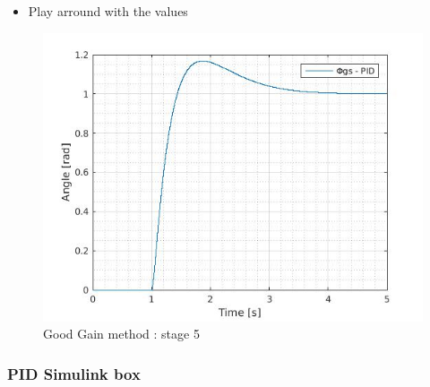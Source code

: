     
\begin{itemize}
  \item Play arround with the values
\end{itemize}
  
  \begin{figure}[H]
    \centering
    \includegraphics[scale=0.4]{figures/GG5.jpg}
    \caption[LABEL] {Good Gain method : stage 5} 
  \end{figure} 
  
  
  \subsubsection{PID Simulink box}